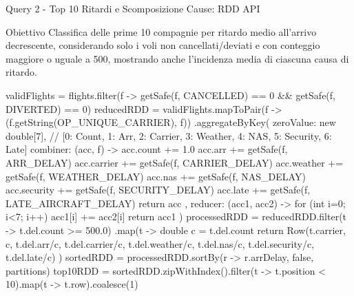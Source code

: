 \documentclass[10pt, aspectratio=169]{beamer}
\newcommand{\queryobjective}[1]{
    \vspace{-0.5cm}
    \begin{exampleblock}{\footnotesize Obiettivo}
    \scriptsize #1
    \end{exampleblock}
    \vfill
}
\begin{document}
\begin{frame}[fragile, t]{Query 2 - Top 10 Ritardi e Scomposizione Cause: RDD API}

    \queryobjective{Classifica delle prime 10 compagnie per ritardo medio all'arrivo decrescente, considerando solo i voli non cancellati/deviati e con conteggio maggiore o uguale a 500, mostrando anche l'incidenza media di ciascuna causa di ritardo.}

    \begin{rddcodebox}
validFlights = flights.filter(f -> getSafe(f, CANCELLED) == 0 && getSafe(f, DIVERTED) == 0)
reducedRDD = validFlights.mapToPair(f -> (f.getString(OP_UNIQUE_CARRIER), f))
    .aggregateByKey(
        zeroValue: new double[7],  // [0: Count, 1: Arr, 2: Carrier, 3: Weather, 4: NAS, 5: Security, 6: Late]
        combiner: (acc, f) -> {
            acc.count   += 1.0                             acc.arr         += getSafe(f, ARR_DELAY)
            acc.carrier += getSafe(f, CARRIER_DELAY)       acc.weather     += getSafe(f, WEATHER_DELAY)
            acc.nas     += getSafe(f, NAS_DELAY)           acc.security    += getSafe(f, SECURITY_DELAY)
            acc.late    += getSafe(f, LATE_AIRCRAFT_DELAY)
            return acc
        },
        reducer: (acc1, acc2) -> {
            for (int i=0; i<7; i++) acc1[i] += acc2[i]
            return acc1
        })
processedRDD = reducedRDD.filter(t -> t.del.count >= 500.0)
    .map(t -> {
        double c = t.del.count
        return Row(t.carrier, c, t.del.arr/c, t.del.carrier/c, t.del.weather/c, t.del.nas/c, t.del.security/c, t.del.late/c)
    })
sortedRDD = processedRDD.sortBy(r -> r.arrDelay, false, partitions)
top10RDD  = sortedRDD.zipWithIndex().filter(t -> t.position < 10).map(t -> t.row).coalesce(1)
    \end{rddcodebox}

\end{frame}
\end{document}
